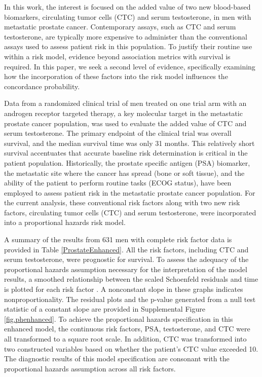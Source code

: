 \documentclass[12pt]{article}
\begin{document}
In this work, the interest is focused on the added value of two new blood-based biomarkers, circulating tumor cells (CTC) and serum testosterone, in men with metastatic prostate cancer. Contemporary assays, such as CTC and serum testosterone, are typically more expensive to administer than the conventional assays used to assess patient risk in this population. To justify their routine use within a risk model, evidence beyond association metrics with survival is required. In this paper, we seek a second level of evidence, specifically examining how the incorporation of these factors into the risk model influences the concordance probability. 

Data from a randomized clinical trial \citep{Saad2015} of men treated on one trial arm with an androgen receptor targeted therapy, a key molecular target in the metastatic prostate cancer population, was used to evaluate the added value of CTC and serum testosterone. The primary endpoint of the clinical trial was overall survival, and the median survival time was only 31 months. This relatively short survival accentuates that accurate baseline risk determination is critical in the patient population. Historically, the prostate specific antigen (PSA) biomarker, the metastatic site where the cancer has spread (bone or soft tissue), and the ability of the patient to perform routine tasks (ECOG status), have been employed to assess patient risk in the metastatic prostate cancer population. For the current analysis, these conventional risk factors along with two new risk factors, circulating tumor cells (CTC) and serum testosterone, were incorporated into a proportional hazards risk model. 

A summary of the results from 631 men with complete risk factor data is provided in Table \ref{ProstateEnhanced}. All the risk factors, including CTC and serum testosterone, were prognostic for survival. To assess the adequacy of the proportional hazards assumption necessary for the interpretation of the model results, a smoothed relationship between the scaled Schoenfeld residuals and time is plotted for each risk factor \citep{Grambsch1994}. A nonconstant slope in these graphs indicates nonproportionality. The residual plots and the p-value generated from a null test statistic of a constant slope are provided in Supplemental Figure \ref{fig.phenhanced}. To achieve the proportional hazards specification in this enhanced model, the continuous risk factors, PSA, testosterone, and CTC were all transformed to a square root scale. In addition, CTC was transformed into two constructed variables based on whether the patient's CTC value exceeded 10. The diagnostic results of this model specification are consonant with the proportional hazards assumption across all risk factors. 
\end{document}
